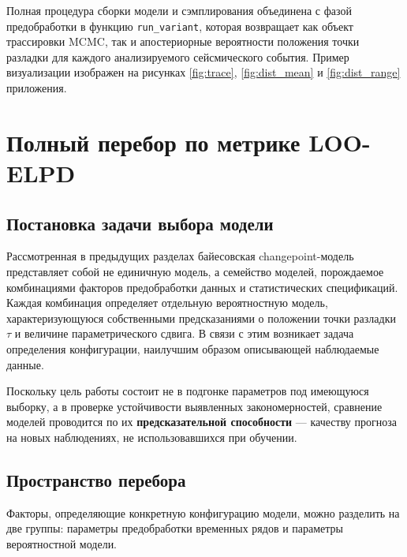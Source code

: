 \documentclass[14pt]{mmcs_article}
\begin{document}
Полная процедура сборки модели и
сэмплирования объединена  с фазой предобработки в функцию \texttt{run\_variant},
которая возвращает как объект трассировки MCMC, так и
апостериорные вероятности положения точки разладки для
каждого анализируемого сейсмического события. Пример визуализации изображен на рисунках \ref{fig:trace}, \ref{fig:dist_mean} и \ref{fig:dist_range} приложения.

\section{Полный перебор по метрике LOO-ELPD}

\subsection*{Постановка задачи выбора модели}

Рассмотренная в предыдущих разделах байесовская
changepoint-модель представляет собой не единичную модель, а
семейство моделей, порождаемое комбинациями факторов
предобработки данных и статистических спецификаций. Каждая
комбинация определяет отдельную вероятностную модель,
характеризующуюся собственными предсказаниями о положении
точки разладки $\tau$ и величине параметрического сдвига.
В связи с этим возникает задача определения конфигурации,
наилучшим образом описывающей наблюдаемые данные.

Поскольку цель работы состоит не в подгонке параметров под
имеющуюся выборку, а в проверке устойчивости выявленных
закономерностей, сравнение моделей проводится по их
\textbf{предсказательной способности} — качеству прогноза
на новых наблюдениях, не использовавшихся при обучении.

\subsection*{Пространство перебора}

Факторы, определяющие конкретную конфигурацию модели, можно
разделить на две группы: параметры предобработки временных
рядов и параметры вероятностной модели.
\end{document}
